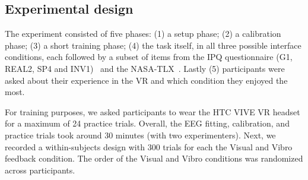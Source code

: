 \subsection{Experimental design}
The experiment consisted of five phases: (1) a setup phase; (2) a calibration phase; (3) a short training phase; (4) the task itself, in all three possible interface conditions, each followed by a subset of items from the IPQ questionnaire (G1, REAL2, SP4 and INV1)~\cite{Schubert2003-sq} and the NASA-TLX~\cite{Hart1988-iw}. Lastly (5) participants were asked about their experience in the VR and which condition they enjoyed the most.

For training purposes, we asked participants to wear the HTC VIVE VR headset for a maximum of 24 practice trials. Overall, the EEG fitting, calibration, and practice trials took around 30 minutes (with two experimenters). Next, we recorded a within-subjects design with 300 trials for each the Visual and Vibro feedback condition. The order of the Visual and Vibro conditions was randomized across participants.




